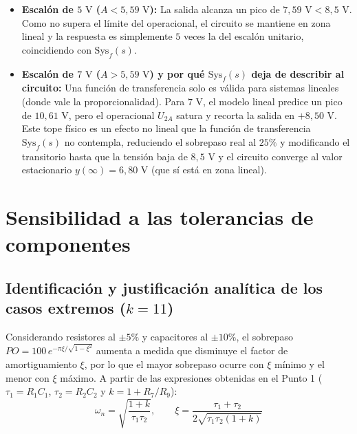 \documentclass[11pt,a4paper]{article}
\begin{document}
\begin{itemize}
    \item \textbf{Escalón de $5\text{ V}$ ($A < 5,59\text{ V}$):} La salida alcanza un pico de $7,59\text{ V} < 8,5\text{ V}$. Como no supera el límite del operacional, el circuito se mantiene en zona lineal y la respuesta es simplemente $5$ veces la del escalón unitario, coincidiendo con $\text{Sys}_f(s)$.
    \item \textbf{Escalón de $7\text{ V}$ ($A > 5,59\text{ V}$) y por qué $\text{Sys}_f(s)$ deja de describir al circuito:} Una función de transferencia solo es válida para sistemas lineales (donde vale la proporcionalidad). Para $7\text{ V}$, el modelo lineal predice un pico de $10,61\text{ V}$, pero el operacional $U_{2A}$ satura y recorta la salida en $+8,50\text{ V}$. Este tope físico es un efecto no lineal que la función de transferencia $\text{Sys}_f(s)$ no contempla, reduciendo el sobrepaso real al $25\%$ y modificando el transitorio hasta que la tensión baja de $8,5\text{ V}$ y el circuito converge al valor estacionario $y(\infty) = 6,80\text{ V}$ (que sí está en zona lineal).
\end{itemize}

\section{Sensibilidad a las tolerancias de componentes}

\subsection{Identificación y justificación analítica de los casos extremos ($k = 11$)}
Considerando resistores al $\pm 5\%$ y capacitores al $\pm 10\%$, el sobrepaso $PO = 100\,e^{-\pi\xi/\sqrt{1-\xi^2}}$ aumenta a medida que disminuye el factor de amortiguamiento $\xi$, por lo que el mayor sobrepaso ocurre con $\xi$ mínimo y el menor con $\xi$ máximo. A partir de las expresiones obtenidas en el Punto 1 ($\tau_1 = R_1 C_1$, $\tau_2 = R_2 C_2$ y $k = 1 + R_7/R_9$):
\begin{equation}
    \omega_n = \sqrt{\frac{1+k}{\tau_1 \tau_2}}, \qquad \xi = \frac{\tau_1 + \tau_2}{2\sqrt{\tau_1 \tau_2 (1+k)}}
\end{equation}
\end{document}
